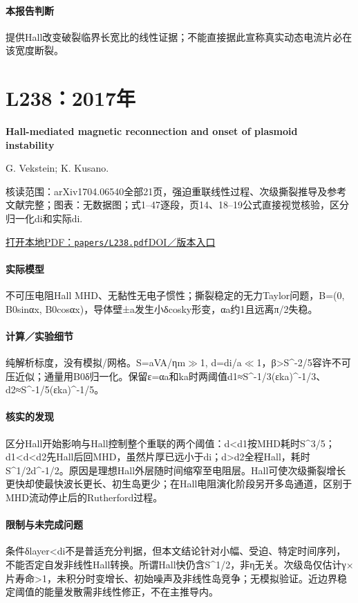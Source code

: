 \paragraph{本报告判断}提供Hall改变破裂临界长宽比的线性证据；不能直接据此宣称真实动态电流片必在该宽度断裂。

\section{L238：2017年}\label{paper:L238}

\textbf{Hall-mediated magnetic reconnection and onset of plasmoid instability}\citep{L238}\

G. Vekstein;  K. Kusano.

\textsf{核读范围：}arXiv1704.06540全部21页，强迫重联线性过程、次级撕裂推导及参考文献完整；\textsf{图表：}无数据图；式1–47逐段，页14、18–19公式直接视觉核验，区分归一化di和实际di.

\href{run:papers/L238.pdf}{打开本地PDF：\texttt{papers/L238.pdf}}\quad\href{https://arxiv.org/abs/1704.06540}{DOI／版本入口}

\paragraph{实际模型}不可压电阻Hall MHD、无黏性无电子惯性；撕裂稳定的无力Taylor问题，B=(0, B0sinαx, B0cosαx)，导体壁±a发生小δcosky形变，αa约1且远离π/2失稳。

\paragraph{计算／实验细节}纯解析标度，没有模拟/网格。S=aVA/ηm\ensuremath{\gg}1, d=di/a\ensuremath{\ll}1，β>S\textasciicircum{}-2/5容许不可压近似；通量用B0δ归一化。保留ε=αa和ka时两阈值d1≈S\textasciicircum{}-1/3(εka)\textasciicircum{}-1/3、d2≈S\textasciicircum{}-1/5(εka)\textasciicircum{}-1/5。

\paragraph{核实的发现}区分Hall开始影响与Hall控制整个重联的两个阈值：d<d1按MHD耗时S\textasciicircum{}3/5；d1<d<d2先Hall后回MHD，虽然片厚已远小于di；d>d2全程Hall，耗时S\textasciicircum{}1/2d\textasciicircum{}-1/2。原因是理想Hall外层随时间缩窄至电阻层。Hall可使次级撕裂增长更快却使最快波长更长、初生岛更少；在Hall电阻演化阶段另开多岛通道，区别于MHD流动停止后的Rutherford过程。

\paragraph{限制与未完成问题}条件δlayer<di不是普适充分判据，但本文结论针对小幅、受迫、特定时间序列，不能否定自发非线性Hall转换。所谓Hall快仍含S\textasciicircum{}1/2，非η无关。次级岛仅估计γ×片寿命>1，未积分时变增长、初始噪声及非线性岛竞争；无模拟验证。近边界稳定阈值的能量发散需非线性修正，不在主推导内。

